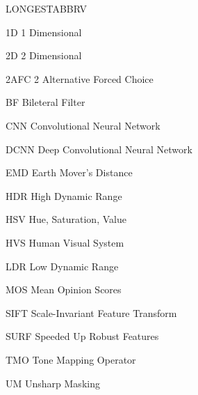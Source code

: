 \begin{theglossary}{LONGESTABBRV}

\item[1D] 1 Dimensional 
\item[2D] 2 Dimensional
\item[2AFC] 2 Alternative Forced Choice
\item[BF] Bileteral Filter
\item[CNN] Convolutional Neural Network
\item[DCNN] Deep Convolutional Neural Network
\item[EMD] Earth Mover's Distance
\item[HDR] High Dynamic Range
\item[HSV] Hue, Saturation, Value
\item[HVS] Human Visual System
\item[LDR] Low Dynamic Range
\item[MOS] Mean Opinion Scores
\item[SIFT] Scale-Invariant Feature Transform
\item[SURF] Speeded Up Robust Features
\item[TMO] Tone Mapping Operator
\item[UM] Unsharp Masking

\end{theglossary}
